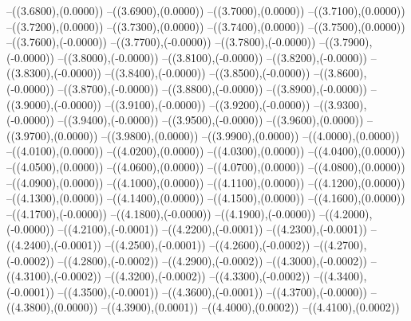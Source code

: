 {	--({\sx*(3.6800)},{\sy*(0.0000)})
	--({\sx*(3.6900)},{\sy*(0.0000)})
	--({\sx*(3.7000)},{\sy*(0.0000)})
	--({\sx*(3.7100)},{\sy*(0.0000)})
	--({\sx*(3.7200)},{\sy*(0.0000)})
	--({\sx*(3.7300)},{\sy*(0.0000)})
	--({\sx*(3.7400)},{\sy*(0.0000)})
	--({\sx*(3.7500)},{\sy*(0.0000)})
	--({\sx*(3.7600)},{\sy*(-0.0000)})
	--({\sx*(3.7700)},{\sy*(-0.0000)})
	--({\sx*(3.7800)},{\sy*(-0.0000)})
	--({\sx*(3.7900)},{\sy*(-0.0000)})
	--({\sx*(3.8000)},{\sy*(-0.0000)})
	--({\sx*(3.8100)},{\sy*(-0.0000)})
	--({\sx*(3.8200)},{\sy*(-0.0000)})
	--({\sx*(3.8300)},{\sy*(-0.0000)})
	--({\sx*(3.8400)},{\sy*(-0.0000)})
	--({\sx*(3.8500)},{\sy*(-0.0000)})
	--({\sx*(3.8600)},{\sy*(-0.0000)})
	--({\sx*(3.8700)},{\sy*(-0.0000)})
	--({\sx*(3.8800)},{\sy*(-0.0000)})
	--({\sx*(3.8900)},{\sy*(-0.0000)})
	--({\sx*(3.9000)},{\sy*(-0.0000)})
	--({\sx*(3.9100)},{\sy*(-0.0000)})
	--({\sx*(3.9200)},{\sy*(-0.0000)})
	--({\sx*(3.9300)},{\sy*(-0.0000)})
	--({\sx*(3.9400)},{\sy*(-0.0000)})
	--({\sx*(3.9500)},{\sy*(-0.0000)})
	--({\sx*(3.9600)},{\sy*(0.0000)})
	--({\sx*(3.9700)},{\sy*(0.0000)})
	--({\sx*(3.9800)},{\sy*(0.0000)})
	--({\sx*(3.9900)},{\sy*(0.0000)})
	--({\sx*(4.0000)},{\sy*(0.0000)})
	--({\sx*(4.0100)},{\sy*(0.0000)})
	--({\sx*(4.0200)},{\sy*(0.0000)})
	--({\sx*(4.0300)},{\sy*(0.0000)})
	--({\sx*(4.0400)},{\sy*(0.0000)})
	--({\sx*(4.0500)},{\sy*(0.0000)})
	--({\sx*(4.0600)},{\sy*(0.0000)})
	--({\sx*(4.0700)},{\sy*(0.0000)})
	--({\sx*(4.0800)},{\sy*(0.0000)})
	--({\sx*(4.0900)},{\sy*(0.0000)})
	--({\sx*(4.1000)},{\sy*(0.0000)})
	--({\sx*(4.1100)},{\sy*(0.0000)})
	--({\sx*(4.1200)},{\sy*(0.0000)})
	--({\sx*(4.1300)},{\sy*(0.0000)})
	--({\sx*(4.1400)},{\sy*(0.0000)})
	--({\sx*(4.1500)},{\sy*(0.0000)})
	--({\sx*(4.1600)},{\sy*(0.0000)})
	--({\sx*(4.1700)},{\sy*(-0.0000)})
	--({\sx*(4.1800)},{\sy*(-0.0000)})
	--({\sx*(4.1900)},{\sy*(-0.0000)})
	--({\sx*(4.2000)},{\sy*(-0.0000)})
	--({\sx*(4.2100)},{\sy*(-0.0001)})
	--({\sx*(4.2200)},{\sy*(-0.0001)})
	--({\sx*(4.2300)},{\sy*(-0.0001)})
	--({\sx*(4.2400)},{\sy*(-0.0001)})
	--({\sx*(4.2500)},{\sy*(-0.0001)})
	--({\sx*(4.2600)},{\sy*(-0.0002)})
	--({\sx*(4.2700)},{\sy*(-0.0002)})
	--({\sx*(4.2800)},{\sy*(-0.0002)})
	--({\sx*(4.2900)},{\sy*(-0.0002)})
	--({\sx*(4.3000)},{\sy*(-0.0002)})
	--({\sx*(4.3100)},{\sy*(-0.0002)})
	--({\sx*(4.3200)},{\sy*(-0.0002)})
	--({\sx*(4.3300)},{\sy*(-0.0002)})
	--({\sx*(4.3400)},{\sy*(-0.0001)})
	--({\sx*(4.3500)},{\sy*(-0.0001)})
	--({\sx*(4.3600)},{\sy*(-0.0001)})
	--({\sx*(4.3700)},{\sy*(-0.0000)})
	--({\sx*(4.3800)},{\sy*(0.0000)})
	--({\sx*(4.3900)},{\sy*(0.0001)})
	--({\sx*(4.4000)},{\sy*(0.0002)})
	--({\sx*(4.4100)},{\sy*(0.0002)})
}
